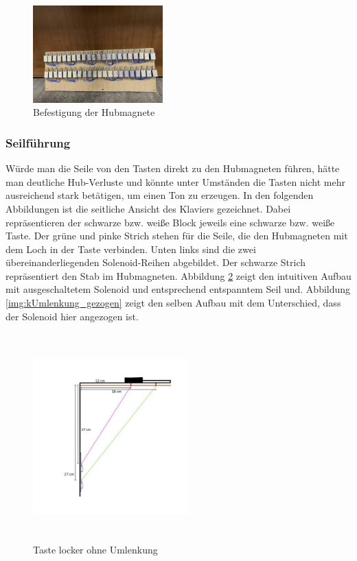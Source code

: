 \begin{figure}[htbp]
    \centering
    \includegraphics[width=5cm]{img/Magnetbrett.jpg}
    \caption{Befestigung der Hubmagnete}
    \label{fig:BefestigungHubmagnete}
\end{figure}

\subsubsection{Seilführung}

Würde man die Seile von den Tasten direkt zu den Hubmagneten führen,
hätte man deutliche Hub-Verluste und könnte unter Umständen die Tasten nicht mehr ausreichend stark betätigen, um einen Ton zu erzeugen.
\newline
In den folgenden Abbildungen ist die seitliche Ansicht des Klaviers gezeichnet.
Dabei repräsentieren der schwarze bzw. weiße Block jeweils eine schwarze bzw. weiße Taste.
Der grüne und pinke Strich stehen für die Seile, die den Hubmagneten mit dem Loch in der Taste verbinden.
Unten links sind die zwei übereinanderliegenden Solenoid-Reihen abgebildet.
Der schwarze Strich repräsentiert den Stab im Hubmagneten.
\newline
Abbildung \ref{img:kUmlenkung_locker} zeigt den intuitiven Aufbau mit ausgeschaltetem Solenoid und entsprechend entspanntem Seil und.
Abbildung \ref{img:kUmlenkung_gezogen} zeigt den selben Aufbau mit dem Unterschied, dass der Solenoid hier angezogen ist.

\begin{figure}[htbp]
    \centering
    \includegraphics[width=6cm, height=8cm]{img/Umlenkung_locker}
    \caption{Taste locker ohne Umlenkung}
    \label{img:kUmlenkung_locker}
\end{figure}

